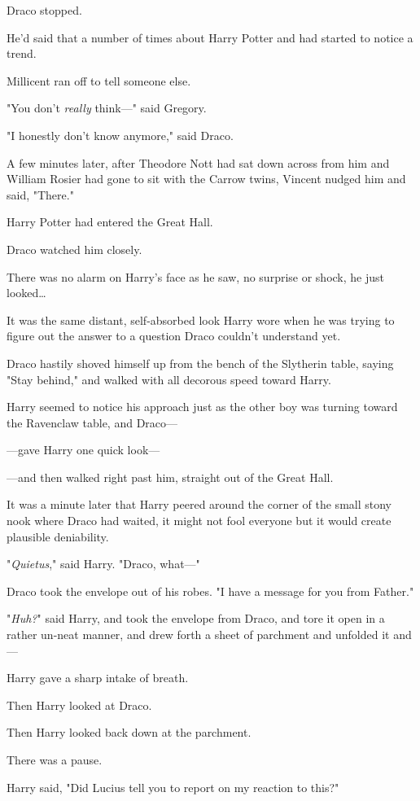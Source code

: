 Draco stopped.

He'd said that a number of times about Harry Potter and had started to notice a 
trend.

Millicent ran off to tell someone else.

"You don't \emph{really} think---" said Gregory.

"I honestly don't know anymore," said Draco.

A few minutes later, after Theodore Nott had sat down across from him and 
William Rosier had gone to sit with the Carrow twins, Vincent nudged him and 
said, "There."

Harry Potter had entered the Great Hall.

Draco watched him closely.

There was no alarm on Harry's face as he saw, no surprise or shock, he just 
looked{\ldots}

It was the same distant, self-absorbed look Harry wore when he was trying to 
figure out the answer to a question Draco couldn't understand yet.

Draco hastily shoved himself up from the bench of the Slytherin table, saying 
"Stay behind," and walked with all decorous speed toward Harry.

Harry seemed to notice his approach just as the other boy was turning toward 
the Ravenclaw table, and Draco---

---gave Harry one quick look---

---and then walked right past him, straight out of the Great Hall.

It was a minute later that Harry peered around the corner of the small stony 
nook where Draco had waited, it might not fool everyone but it would create 
plausible deniability.

"\emph{Quietus}," said Harry. "Draco, what---"

Draco took the envelope out of his robes. "I have a message for you from 
Father."

"\emph{Huh?}" said Harry, and took the envelope from Draco, and tore it open in 
a rather un-neat manner, and drew forth a sheet of parchment and unfolded it 
and---

Harry gave a sharp intake of breath.

Then Harry looked at Draco.

Then Harry looked back down at the parchment.

There was a pause.

Harry said, "Did Lucius tell you to report on my reaction to this?"

